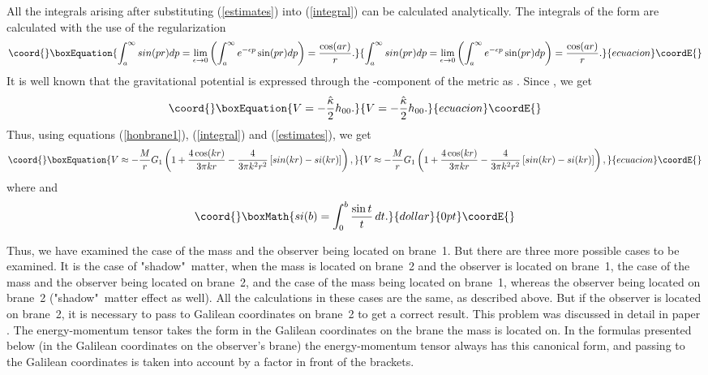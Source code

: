 \documentclass[a4paper,12pt]{article}
\begin{document}
All the integrals arising after substituting (\ref{estimates}) into
(\ref{integral}) can be calculated analytically. The integrals of the
form \coordHE{} are calculated with the use of the
regularization
\begin{equation}\coord{}\boxEquation{
\int_a^\infty sin(pr) dp=\lim_{\epsilon\to 0
}\left(\int_{a}^{\infty} e^{-\epsilon p}\sin(pr) dp
\right)=\frac{\cos(ar)}{r}.
}{
\int_a^\infty sin(pr) dp=\lim_{\epsilon\to 0
}\left(\int_{a}^{\infty} e^{-\epsilon p}\sin(pr) dp
\right)=\frac{\cos(ar)}{r}.
}{ecuacion}\coordE{}\end{equation}
It is well known that the gravitational potential is expressed
through the \coordHE{}-component of the  metric as
\coordHE{} \cite{Weinberg}. Since \coordHE{}, we get
\begin{equation}\coord{}\boxEquation{
V=-\frac{\hat\kappa}{2}h_{00}.
}{
V=-\frac{\hat\kappa}{2}h_{00}.
}{ecuacion}\coordE{}\end{equation}
Thus, using equations
(\ref{honbrane1}), (\ref{integral}) and (\ref{estimates}), we get
\begin{equation}\coord{}\boxEquation{\label{NL1}
V\approx -\frac{M}{r}G_1\left(1+\frac{4\cos(kr)}{3\pi
kr}-\frac{4}{3\pi k^2 r^2}\left[sin(kr)-si(kr)\right]\right),
}{V\approx -\frac{M}{r}G_1\left(1+\frac{4\cos(kr)}{3\pi
kr}-\frac{4}{3\pi k^2 r^2}\left[sin(kr)-si(kr)\right]\right),
}{ecuacion}\coordE{}\end{equation}
where \coordHE{} and $$\coord{}\boxMath{si(b)=\int_0^b
\frac{\sin{t}}{t}\, dt.}{dollar}{0pt}\coordE{}$$

Thus, we have examined the case of the mass and the observer being
located on brane~1. But  there are three more  possible cases to
be examined. It is the case  of "shadow"\ matter, when the mass is
located on brane~2 and the observer is located on brane~1, the
case of the mass and the observer being  located on brane~2, and
the case of the  mass being located on brane~1, whereas the
observer being located on brane~2 ("shadow"\ matter effect as
well). All the calculations in these cases are the same, as
described above. But if the  observer is located on brane~2, it is
necessary to pass to Galilean coordinates on brane~2 to get a
correct result. This problem was discussed in detail in paper
\cite{BKSV}. The energy-momentum tensor \coordHE{} takes the
form \coordHE{} in the Galilean
coordinates on the brane the mass is located on. In the formulas
presented below (in the Galilean coordinates on the observer's
brane) the energy-momentum tensor always has this canonical form,
and passing to the Galilean coordinates is taken into account by a
factor in front of the brackets.
\end{document}
